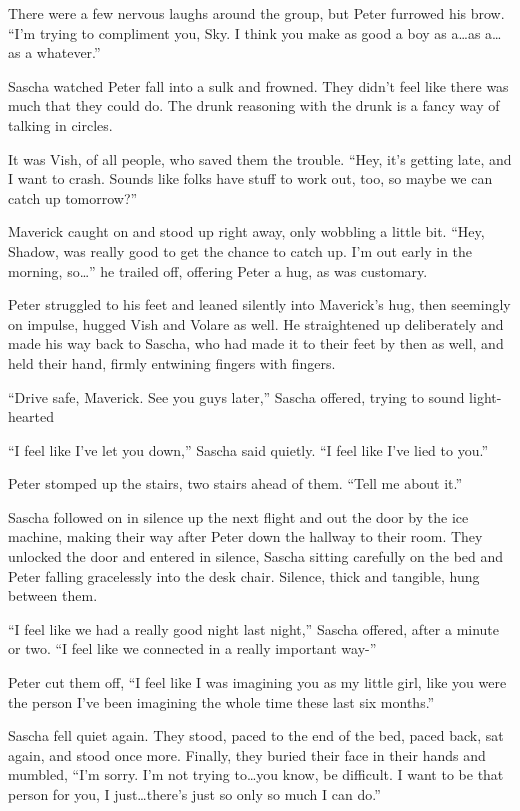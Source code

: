 There were a few nervous laughs around the group, but Peter furrowed his brow. ``I'm trying to compliment you, Sky. I think you make as good a boy as a\ldots{}as a\ldots{}as a whatever.''

Sascha watched Peter fall into a sulk and frowned. They didn't feel like there was much that they could do. The drunk reasoning with the drunk is a fancy way of talking in circles.

It was Vish, of all people, who saved them the trouble. ``Hey, it's getting late, and I want to crash. Sounds like folks have stuff to work out, too, so maybe we can catch up tomorrow?''

Maverick caught on and stood up right away, only wobbling a little bit. ``Hey, Shadow, was really good to get the chance to catch up. I'm out early in the morning, so\ldots{}'' he trailed off, offering Peter a hug, as was customary.

Peter struggled to his feet and leaned silently into Maverick's hug, then seemingly on impulse, hugged Vish and Volare as well. He straightened up deliberately and made his way back to Sascha, who had made it to their feet by then as well, and held their hand, firmly entwining fingers with fingers.

``Drive safe, Maverick. See you guys later,'' Sascha offered, trying to sound light-hearted

\secdiv

``I feel like I've let you down,'' Sascha said quietly. ``I feel like I've lied to you.''

Peter stomped up the stairs, two stairs ahead of them. ``Tell me about it.''

Sascha followed on in silence up the next flight and out the door by the ice machine, making their way after Peter down the hallway to their room. They unlocked the door and entered in silence, Sascha sitting carefully on the bed and Peter falling gracelessly into the desk chair. Silence, thick and tangible, hung between them.

``I feel like we had a really good night last night,'' Sascha offered, after a minute or two. ``I feel like we connected in a really important way-''

Peter cut them off, ``I feel like I was imagining you as my little girl, like you were the person I've been imagining the whole time these last six months.''

Sascha fell quiet again. They stood, paced to the end of the bed, paced back, sat again, and stood once more. Finally, they buried their face in their hands and mumbled, ``I'm sorry. I'm not trying to\ldots{}you know, be difficult. I want to be that person for you, I just\ldots{}there's just so only so much I can do.''

